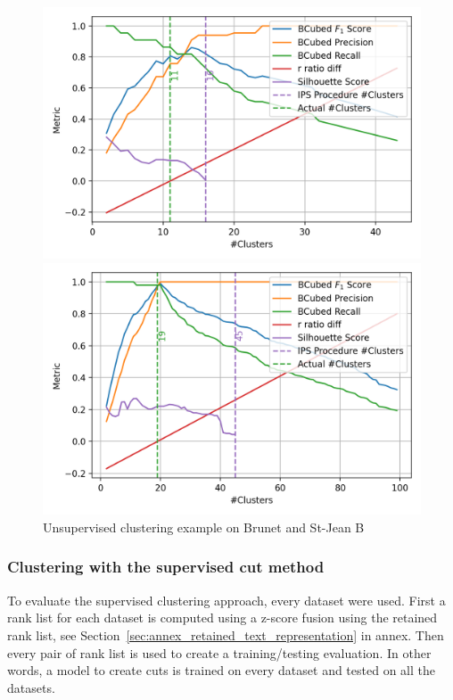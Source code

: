 \begin{figure}
  \caption{Unsupervised clustering example on Brunet and St-Jean B}
  \label{fig:unsupervised_clustering}

  \label{fig:unsupervised_clustering_brunet}
  \includegraphics[width=\linewidth]{img/unsupervised_clustering_brunet.png}

  \label{fig:unsupervised_clustering_st_jean_B}
  \includegraphics[width=\linewidth]{img/unsupervised_clustering_st_jean_B.png}
\end{figure}

\subsubsection{Clustering with the supervised cut method}

To evaluate the supervised clustering approach, every dataset were used.
First a rank list for each dataset is computed using a z-score fusion using the retained rank list, see Section~\ref{sec:annex_retained_text_representation} in annex.
Then every pair of rank list is used to create a training/testing evaluation.
In other words, a model to create cuts is trained on every dataset and tested on all the datasets.

